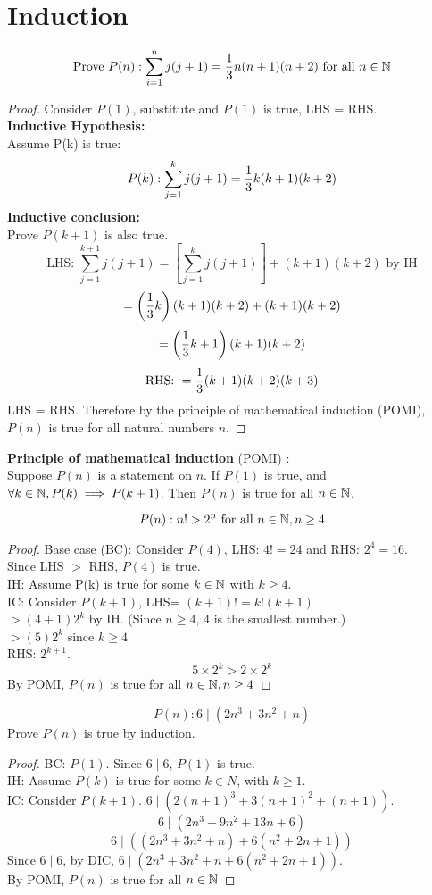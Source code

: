 \documentclass[english, 12pt]{article}
\begin{document}
\section{Induction}
\begin{exmp}
\[ \text{Prove } P(n): \sum_{i=1}^n j(j+1) = \frac{1}{3} n(n+1)(n+2) \text{ for all } n \in {\mathbb{N}} \]
\begin{proof}
Consider $P(1)$, substitute and $P(1)$ is true, LHS = RHS.\\
\textbf{Inductive Hypothesis:}\\
Assume P(k) is true:
\[P(k): \sum_{j=1}^k j(j+1) = \frac{1}{3} k(k+1)(k+2) \]
\textbf{Inductive conclusion:}\\
Prove $P(k+1)$ is also true.\\
\[\text{LHS: }\sum_{j=1}^{k+1} j(j+1) = \left[\sum_{j=1}^{k} j(j+1)\right] + (k+1)(k+2) \text{ by IH} \]
\[ = \left(\frac{1}{3} k\right)(k+1)(k+2) + (k+1)(k+2) \]
\[ = \left(\frac{1}{3} k + 1\right) (k+1)(k+2) \]
\[\text{RHS: } = \frac{1}{3} (k+1)(k+2)(k+3) \]
LHS = RHS. Therefore by the principle of mathematical induction (POMI), $P(n)$ is true for all natural numbers $n$.
\end{proof}
\end{exmp}
\begin{mthd}
\textbf{Principle of mathematical induction} (POMI) :\\
 Suppose $P(n)$ is a statement on $n$. If $P(1)$ is true, and 
$\forall k \in {\mathbb{N}}, P(k) \implies P(k+1)$. Then $P(n)$ is true for all $n \in {\mathbb{N}}$.
\end{mthd}
\begin{exmp}
\[P(n): n! > 2^n \text{ for all } n \in {\mathbb{N}}, n \geq 4\]
\begin{proof}
Base case (BC): Consider $P(4)$, LHS: $4! = 24$ and RHS: $2^4 = 16$.\\ Since LHS $>$ RHS, $P(4)$ is true.\\
IH: Assume P(k) is true for some $k \in {\mathbb{N}}$ with $k \geq 4$.\\
IC: Consider $P(k+1)$, LHS= $(k+1)! = k!(k+1)$\\
 $> (4+1)2^k$ by IH. (Since $n \geq 4$, $4$ is the smallest number.)\\
  $> (5)2^k$ since $k \geq 4$\\
RHS: $2^{k+1}$.
\[ 5\times 2^k > 2\times 2^k \]
By POMI, $P(n)$ is true for all $n \in {\mathbb{N}}, n \geq 4$
\end{proof}
\end{exmp}
\begin{exercise}
\[P(n): 6 \mid (2n^3 + 3n^2 + n) \]
Prove $P(n)$ is true by induction.
\begin{proof}
BC: $P(1)$. Since $6 \mid 6$, $P(1)$ is true.\\
IH: Assume $P(k)$ is true for some $k \in N$, with $k \geq 1$.\\
IC: Consider $P(k+1)$. $6 \mid (2(n+1)^3 + 3(n+1)^2 + (n+1))$.
\[6 \mid (2n^3+9n^2+13n+6) \]
\[6 \mid ((2n^3+3n^2 + n) + 6(n^2 + 2n + 1)) \]
Since $6 \mid 6$, by DIC, $6 \mid (2n^3+3n^2 + n + 6(n^2 + 2n + 1))$.\\
By POMI, $P(n)$ is true for all $n \in {\mathbb{N}}$
\end{proof}
\end{exercise}
\end{document}

